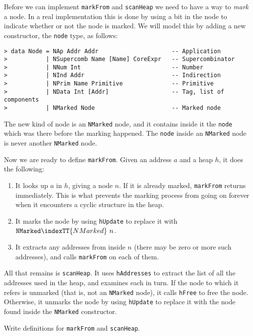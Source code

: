 Before we can implement \mbox{\tt markFrom} and \mbox{\tt scanHeap} we need to
have a way to {\em mark\/} a node.
In a real implementation this
is done by using a bit in the node to indicate
whether or not the node is marked.
We will model this by adding a new constructor, the \mbox{\tt node} type, as follows:
\begin{verbatim}
> data Node = NAp Addr Addr                     -- Application
>           | NSupercomb Name [Name] CoreExpr   -- Supercombinator
>           | NNum Int                          -- Number
>           | NInd Addr                         -- Indirection
>           | NPrim Name Primitive              -- Primitive
>           | NData Int [Addr]                  -- Tag, list of components
>           | NMarked Node                      -- Marked node
\end{verbatim}
%
%
%
%
%
%
%
\par
The new kind of node is an \mbox{\tt NMarked} node, and it contains inside it the \mbox{\tt node}
which was there before the marking happened.
The \mbox{\tt node} inside an \mbox{\tt NMarked} node
is never another \mbox{\tt NMarked} node.

Now we are ready to define \mbox{\tt markFrom}.
Given an address $a$ and a heap $h$, it does the following:
\begin{enumerate}
\item
It looks up $a$ in $h$, giving a node $n$.  If it is already marked, \mbox{\tt markFrom}
returns immediately.  This is what prevents the marking process from going
on forever when it encounters a cyclic structure in the heap.
\item
It marks the node by using \mbox{\tt hUpdate} to replace it with $\mbox{\tt NMarked}\indexTT{NMarked}~n$.
\item
It extracts any addresses from inside $n$ (there may be zero or more
such addresses), and calls \mbox{\tt markFrom} on each of them.
\end{enumerate}
All that remains is \mbox{\tt scanHeap}.   It uses \mbox{\tt hAddresses} to extract the list of
all the addresses used in the heap, and examines each in turn.  If the node
to which it refers is unmarked (that is, not an \mbox{\tt NMarked} node), it calls
\mbox{\tt hFree} to free the node.  Otherwise, it unmarks the node by
using \mbox{\tt hUpdate} to replace it with the node found inside the
\mbox{\tt NMarked} constructor.
\begin{exercise}
Write definitions for \mbox{\tt markFrom} and \mbox{\tt scanHeap}.
\end{exercise}

